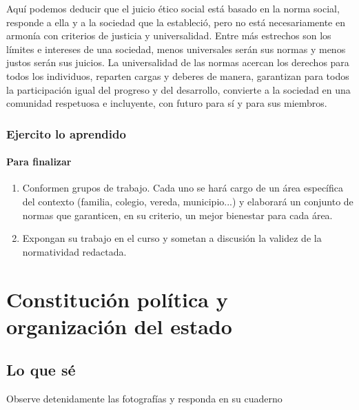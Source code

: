 \documentclass[10pt,twoside]{article}
\begin{document}
Aquí podemos deducir que el juicio ético social está basado en la norma social, responde a ella y a la sociedad que la estableció, pero no está necesariamente en armonía con criterios de justicia y universalidad. Entre más estrechos son los límites e intereses de una
sociedad, menos universales serán sus normas y menos justos serán sus juicios. La universalidad de las normas acercan los derechos para todos los individuos, reparten cargas y deberes de manera, garantizan para todos la participación igual del progreso y del desarrollo, convierte a la sociedad en una comunidad respetuosa e incluyente, con futuro para sí y para sus miembros.
\subsubsection*{Ejercito lo aprendido}
\paragraph*{Para finalizar}
\begin{enumerate}
\item Conformen grupos de trabajo. Cada uno se hará cargo de un área específica del contexto (familia, colegio, vereda, municipio...) y elaborará un conjunto de normas que garanticen, en su criterio, un mejor bienestar para cada área.
\item Expongan su trabajo en el curso y sometan a discusión la validez de la normatividad redactada.
\end{enumerate}
\section*{Constituci\'{o}n pol\'{i}tica y organizaci\'{o}n del estado}
\subsection*{Lo que s\'{e}}
Observe detenidamente las fotograf\'{i}as y responda en su cuaderno
\end{document}

